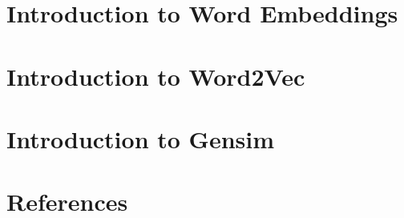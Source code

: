 \section[DNLP]{Introduction to Word Embeddings}


\section[Word2Vec]{Introduction to Word2Vec}



\section[Gensim]{Introduction to Gensim}




\section[Refs]{References}

